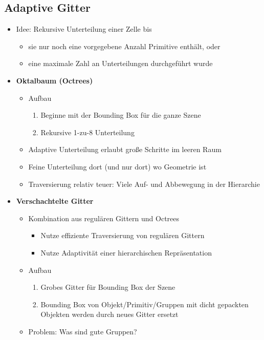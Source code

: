 \subsection{Adaptive Gitter}
\begin{itemize}
	\item Idee: Rekursive Unterteilung einer Zelle bis
	\begin{itemize}
		\item sie nur noch eine vorgegebene Anzahl Primitive enthält, oder
		\item eine maximale Zahl an Unterteilungen durchgeführt wurde
	\end{itemize}
	\item \textbf{Oktalbaum (Octrees)}
	\begin{itemize}
		\item Aufbau
		\begin{enumerate}
			\item Beginne mit der Bounding Box für die ganze Szene
			\item Rekursive 1-zu-8 Unterteilung
		\end{enumerate}
		\item Adaptive Unterteilung erlaubt große Schritte im leeren Raum
		\item Feine Unterteilung dort (und nur dort) wo Geometrie ist
		\item Traversierung relativ teuer: Viele Auf- und Abbewegung in der Hierarchie
	\end{itemize}
	\item \textbf{Verschachtelte Gitter}
	\begin{itemize}
		\item Kombination aus regulären Gittern und Octrees
		\begin{itemize}
			\item Nutze effiziente Traversierung von regulären Gittern
			\item Nutze Adaptivität einer hierarchischen Repräsentation
		\end{itemize}
		\item Aufbau
		\begin{enumerate}
			\item Grobes Gitter für Bounding Box der Szene
			\item Bounding Box von Objekt/Primitiv/Gruppen mit dicht gepackten Objekten werden durch neues Gitter ersetzt
		\end{enumerate}
		\item Problem: Was sind gute Gruppen?
	\end{itemize}
\end{itemize}


